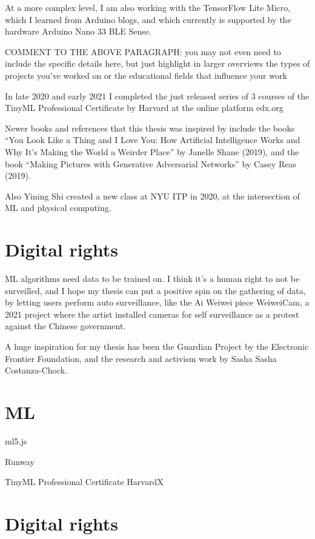At a more complex level, I am also working with the TensorFlow Lite Micro, which I learned from Arduino blogs, and which currently is supported by the hardware Arduino Nano 33 \acrshort{BLE} Sense.

COMMENT TO THE ABOVE PARAGRAPH: you may not even need to include the specific details here, but just highlight in larger overviews the types of projects you've worked on or the educational fields that influence your work

In late 2020 and early 2021 I completed the just released series of 3 courses of the TinyML Professional Certificate by Harvard at the online platform edx.org

Newer books and references that this thesis was inspired by include the books “You Look Like a Thing and I Love You: How Artificial Intelligence Works and Why It's Making the World a Weirder Place” by Janelle Shane (2019), and the book “Making Pictures with Generative Adversarial Networks” by Casey Reas (2019).

Also Yining Shi created a new class at \acrshort{NYU} \acrshort{ITP} in 2020, at the intersection of \acrshort{ML} and physical computing.

\section{Digital rights}

\acrshort{ML} algorithms need data to be trained on. I think it’s a human right to not be surveilled, and I hope my thesis can put a positive spin on the gathering of data, by letting users perform auto surveillance, like the Ai Weiwei piece WeiweiCam, a 2021 project where the artist installed cameras for self surveillance as a protest against the Chinese government.

A huge inspiration for my thesis has been the Guardian Project by the Electronic Frontier Foundation, and the research and activism work by Sasha Sasha Costanza-Chock.

\section{ML}

ml5.js

Runway

TinyML Professional Certificate HarvardX

\section{Digital rights}

